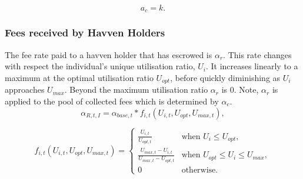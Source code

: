 $$ a_c = k.$$ 

\begin{center}
\end{center}

\newpage
\subsubsection{Fees received by Havven Holders}

\noindent The fee rate paid to a havven holder that has escrowed is $\alpha_r$. This rate changes with respect the individual's unique utilisation ratio, $U_i$. It increases linearly to a maximum at the optimal utilisation ratio $U_{opt}$, before quickly diminishing as $U_i$ approaches $U_{max}$. Beyond the maximum utilisation ratio $\alpha_r$ is 0. Note, $\alpha_r$ is applied to the pool of collected fees which is determined by $\alpha_c$. \\

$$ \alpha_{R,t,I} = \alpha_{base,t} * f_{i,t}(U_{i,t}, U_{opt}, U_{max,t}), $$

\[
f_{i,t}(U_{i,t}, U_{opt}, U_{max,t}) = 
\begin{cases}
 \frac{U_{i,t}}{U_{opt,t}} &\mbox{when } U_i \leq U_{opt}, \\[1em]
 \frac{U_{max,t} - U_{i,t}}{U_{max,t} - U_{opt,t}} &\mbox{when } U_{opt} \leq U_i \leq U_{max}, \\[1em]
 0 &\mbox{otherwise}.
 \end{cases}
\]

\begin{center}
\end{center}

